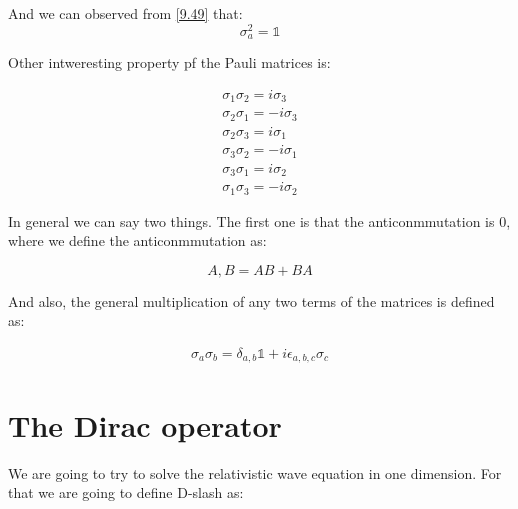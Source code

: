 And we can observed from \ref{9.49} that:
\begin{equation}
  \sigma_a^2 = \mathbb{1}
\end{equation}

Other intweresting property pf the Pauli matrices is:

\begin{equation}
  \begin{array}{c}
    \sigma_1 \sigma_2 = i\sigma_3
    \\
    \sigma_2 \sigma_1 = -i\sigma_3
    \\
    \sigma_2 \sigma_3 = i\sigma_1
    \\
    \sigma_3 \sigma_2 = -i\sigma_1
    \\
    \sigma_3 \sigma_1 = i\sigma_2
    \\
    \sigma_1 \sigma_3 = -i\sigma_2
  \end{array}
\end{equation}

In general we can say two things. The first one is that the anticonmmutation is 0, where we define the anticonmmutation as:

\begin{equation}
  {A,B} = AB+BA
\end{equation}

And also, the general multiplication of any two terms of the matrices is defined as:

\begin{equation}
\begin{array}{c}
  \sigma_a \sigma_b = \delta_{a,b}\mathbb{1} + i\epsilon_{a,b,c}\sigma_c
\end{array}
\end{equation}

\section{The Dirac operator}

We are going to try to solve the relativistic wave equation in one dimension. For that we are going to define D-slash as:

